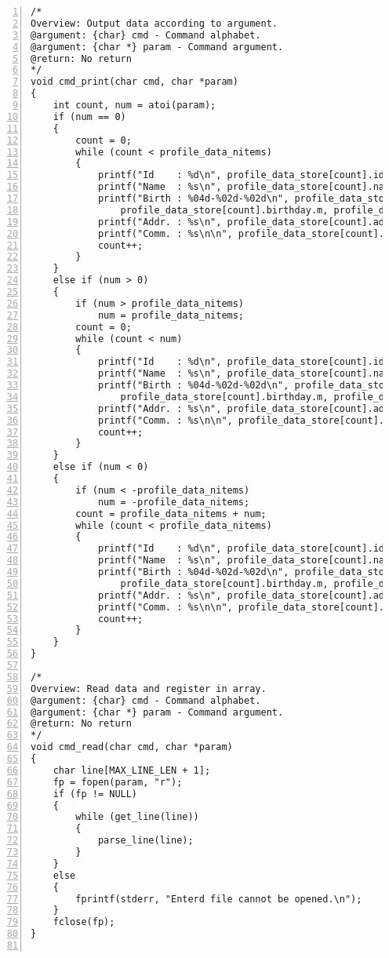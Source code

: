 \documentclass[autodetect-engine,dvi=dvipdfmx,ja=standard,
               a4j,11pt]{bxjsarticle}
\begin{document}
\begin{Verbatim}[numbers=left, xleftmargin=10mm, numbersep=6pt,
    fontsize=\small, baselinestretch=0.8]
/*
Overview: Output data according to argument.
@argument: {char} cmd - Command alphabet.
@argument: {char *} param - Command argument.
@return: No return
*/
void cmd_print(char cmd, char *param)
{
    int count, num = atoi(param);
    if (num == 0)
    {
        count = 0;
        while (count < profile_data_nitems)
        {
            printf("Id    : %d\n", profile_data_store[count].id);
            printf("Name  : %s\n", profile_data_store[count].name);
            printf("Birth : %04d-%02d-%02d\n", profile_data_store[count].birthday.y,
                profile_data_store[count].birthday.m, profile_data_store[count].birthday.d);
            printf("Addr. : %s\n", profile_data_store[count].address);
            printf("Comm. : %s\n\n", profile_data_store[count].note);
            count++;
        }
    }
    else if (num > 0)
    {
        if (num > profile_data_nitems)
            num = profile_data_nitems;
        count = 0;
        while (count < num)
        {
            printf("Id    : %d\n", profile_data_store[count].id);
            printf("Name  : %s\n", profile_data_store[count].name);
            printf("Birth : %04d-%02d-%02d\n", profile_data_store[count].birthday.y,
                profile_data_store[count].birthday.m, profile_data_store[count].birthday.d);
            printf("Addr. : %s\n", profile_data_store[count].address);
            printf("Comm. : %s\n\n", profile_data_store[count].note);
            count++;
        }
    }
    else if (num < 0)
    {
        if (num < -profile_data_nitems)
            num = -profile_data_nitems;
        count = profile_data_nitems + num;
        while (count < profile_data_nitems)
        {
            printf("Id    : %d\n", profile_data_store[count].id);
            printf("Name  : %s\n", profile_data_store[count].name);
            printf("Birth : %04d-%02d-%02d\n", profile_data_store[count].birthday.y,
                profile_data_store[count].birthday.m, profile_data_store[count].birthday.d);
            printf("Addr. : %s\n", profile_data_store[count].address);
            printf("Comm. : %s\n\n", profile_data_store[count].note);
            count++;
        }
    }
}

/*
Overview: Read data and register in array.
@argument: {char} cmd - Command alphabet.
@argument: {char *} param - Command argument.
@return: No return
*/
void cmd_read(char cmd, char *param)
{
    char line[MAX_LINE_LEN + 1];
    fp = fopen(param, "r");
    if (fp != NULL)
    {
        while (get_line(line))
        {
            parse_line(line);
        }
    }
    else
    {
        fprintf(stderr, "Enterd file cannot be opened.\n");
    }
    fclose(fp);
}


\end{Verbatim}
\end{document}
